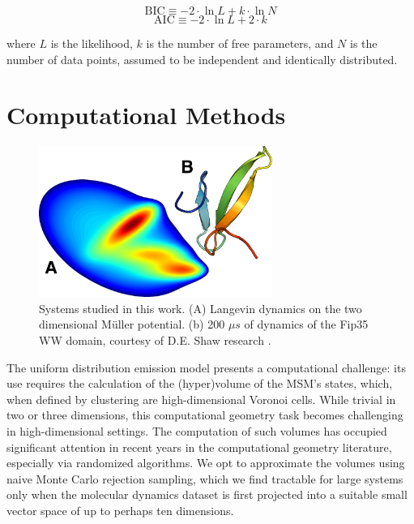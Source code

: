 \documentclass[twocolumn,floatfix,nofootinbib,aps]{revtex4-1}
\begin{document}
\begin{equation}
\label{eq:bic}
\mathrm{BIC} \equiv -2\cdot \ln L + k \cdot \ln N
\end{equation}
\begin{equation}
\label{eq:eic}
\mathrm{AIC} \equiv -2\cdot \ln L + 2 \cdot k
\end{equation}

where $L$ is the likelihood, $k$ is the number of free parameters, and $N$ is the number of data points, assumed to be independent and identically distributed.

\section{Computational Methods}

\begin{figure}
\centering
\includegraphics[width=3in]{figs/mull_ww.png}
\caption{Systems studied in this work. (A) Langevin dynamics on the two dimensional M\"{u}ller potential. (b) 200 $\mu s$ of dynamics of the Fip35 WW domain\cite{Liu2008Experimental}, courtesy of D.E. Shaw research \cite{Shaw2010Atomic}.}
\end{figure}

The uniform distribution emission model presents a computational challenge: its use requires the calculation of the (hyper)volume of the MSM's states, which, when defined by clustering are high-dimensional Voronoi cells. While trivial in two or three dimensions, this computational geometry task becomes challenging in high-dimensional settings. The computation of such volumes has occupied significant attention in recent years in the computational geometry literature, especially via randomized algorithms\cite{Kannan97, Simonovits03, Lovasz03}. We opt to approximate the volumes using naive Monte Carlo rejection sampling, which we find tractable for large systems only when the molecular dynamics dataset is first projected into a suitable small vector space of up to perhaps ten dimensions.
\end{document}
